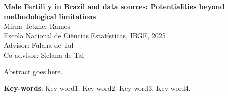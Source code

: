 \begin{resumo}[Abstract]

  \begin{center} 
    \textbf{Male Fertility in Brazil and data sources: Potentialities beyond methodological limitations}\\[1em]
  Mirna Tetzner Ramos \\
  Escola Nacional de Ciências Estatísticas, IBGE, 2025\\[1em]
  Advisor: Fulana de Tal\\
  Co-advisor: Siclana de Tal
\end{center}

\begin{SingleSpace}
Abstract goes here.
\end{SingleSpace}

 \textbf{Key-words}: Key-word1. Key-word2. Key-word3. Key-word4. 
\end{resumo}